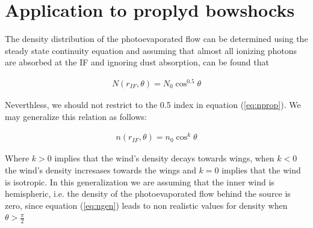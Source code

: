 \section{Application to proplyd bowshocks}
\label{sec:application}


The density distribution of the photoevaporated flow can be determined using the steady state continuity equation and assuming that almost all ionizing photons are absorbed at the IF 
\citep{HA:1998} and ignoring dust absorption, can be found that

\begin{align}
N(r_{IF},\theta) = N_0 \cos^{0.5}\theta
\label{eq:nprop}
\end{align}

Neverthless, we should not restrict to the 0.5 index in equation (\ref{eq:nprop}). We may generalize this relation as follows:

\begin{align}
n(r_{IF},\theta) = n_0 \cos^{k}\theta
\label{eq:ngen}
\end{align}

Where $k >0$ implies that the wind's density decays towards wings, when $k<0$ the wind's density incresases towards the wings and $k=0$
implies that the wind is isotropic.
In this generalization we are assuming that the inner wind is hemispheric, i.e. the density of the photoevaporated flow behind the source is zero, since equation
(\ref{eq:ngen}) leads to non realistic values for density when $\theta > \frac{\pi}{2}$










